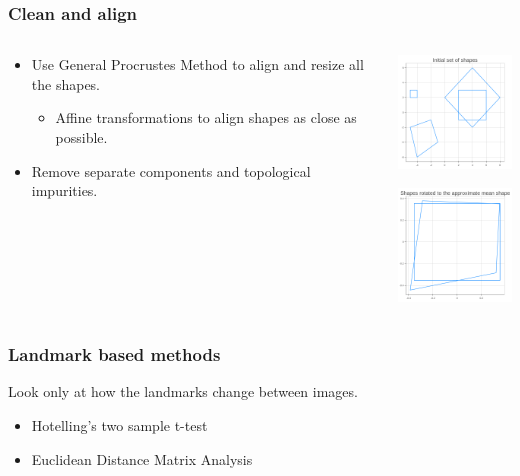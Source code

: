 \documentclass{beamer} %
\theoremstyle{definition} %
\begin{document}
\begin{frame}
\frametitle{Clean and align}



\begin{columns} %

\begin{column}{0.5\textwidth} %
\begin{itemize}
\item Use General Procrustes Method to align and resize all the shapes. 
\begin{itemize}
\item Affine transformations to align shapes as close as possible.
\end{itemize}
\item Remove separate components and topological impurities.
\end{itemize}
\end{column}
\begin{column}{0.5\textwidth} %
\begin{center}

\includegraphics[width=3.5cm ]{../images/GPA_initial_shapes.png}

\includegraphics[width=3.5cm]{../images/GPA_rotated_shapes.png}
 
 \end{center}
\end{column}

\end{columns}

\end{frame}


\begin{frame}
\frametitle{Landmark based methods}

Look only at how the landmarks change between images.
\vspace{1cm}

\pause
\begin{itemize}
\item Hotelling's two sample t-test
\item Euclidean Distance Matrix Analysis

\end{itemize}




\end{frame}
\end{document}
